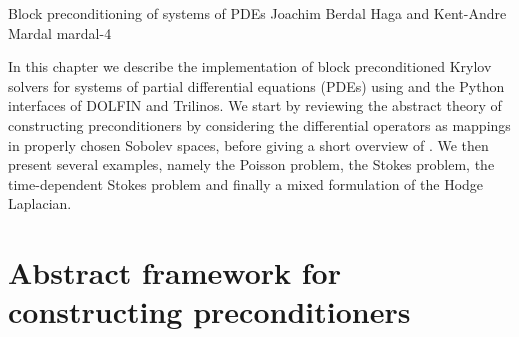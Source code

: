               {Block preconditioning of systems of PDEs}
              {Joachim Berdal Haga and Kent-Andre Mardal}
              {mardal-4}

\newcommand{\algorithmexample}[3]{%
\begin{figure*}
  \begin{center}
    \small
    \begin{tabular}{l}
      \hline
      \textbf{Algorithm example #1:} #2 \\
      \hline
      \begin{minipage}{0.9\textwidth}
        \vspace{0.1cm}
        \begin{enumerate}
          #3
        \end{enumerate}
        \vspace{0.1cm}
      \end{minipage} \\
      \hline
    \end{tabular}
    \normalsize
  \end{center}
\end{figure*}}

In this chapter we describe the implementation of block preconditioned
Krylov solvers for systems of partial differential equations (PDEs)
using  and the Python interfaces of
DOLFIN and Trilinos.  We start by reviewing the
abstract theory of constructing preconditioners
by considering the differential operators as mappings in properly
chosen Sobolev spaces, before giving a short overview
of . We then present several examples, namely the
Poisson problem, the Stokes problem, the time-dependent Stokes problem
and finally a mixed formulation of the Hodge Laplacian.

\section{Abstract framework for constructing preconditioners}

